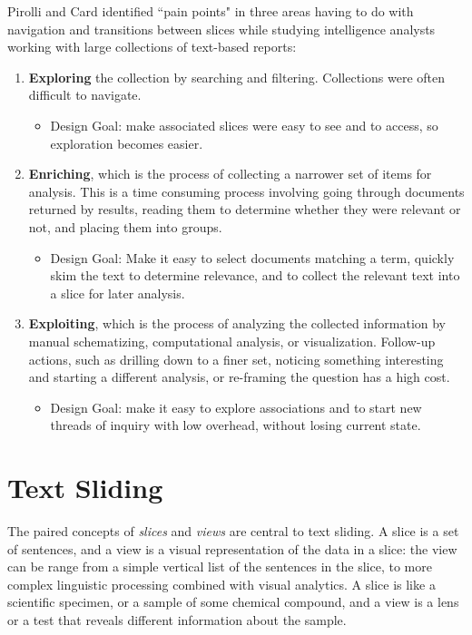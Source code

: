 \documentclass{sig-alternate}
\newcommand{\strong}[1] {\textbf{#1}}
\begin{document}
Pirolli and Card \cite{pirolli_sensemaking_2005} identified ``pain points" in three areas having to do with navigation and transitions between slices while studying intelligence analysts working with large collections of text-based reports:
\begin{enumerate}
\item \strong{Exploring} the collection by searching and filtering. Collections were often difficult to navigate. 
	\begin{itemize}
		\item Design Goal: make associated slices were easy to see and to access, so exploration  becomes easier. 
	\end{itemize}
\item \strong{Enriching}, which is the process of collecting a narrower set of items for analysis. This is a time consuming process involving going through documents returned by results, reading them to determine whether they were relevant or not, and placing them into groups.
	\begin{itemize}
		\item Design Goal: Make it easy to select documents matching a term, quickly skim the text to determine relevance, and to collect the relevant text into a slice for later analysis.
	\end{itemize}
\item \strong{Exploiting}, which is the process of analyzing the collected information by manual schematizing, computational analysis, or visualization. Follow-up actions, such as drilling down to a finer set, noticing something interesting and starting a different analysis, or re-framing the question has a high cost.
	\begin{itemize}
		\item Design Goal: make it easy to explore associations and to start new threads of inquiry with low overhead,  without losing current state.
	\end{itemize}
\end{enumerate}


\section{Text Sliding}

The paired concepts of \emph{slices} and \emph{views} are central to text sliding. A slice is a set of sentences, and a view is a visual representation of the data in a slice: the view can be range from a simple vertical list of the sentences in the slice, to more complex linguistic processing combined with visual analytics.  A slice is like a scientific specimen, or a sample of some chemical compound, and a view is a  lens or a test that reveals different information about the sample.
\end{document}
